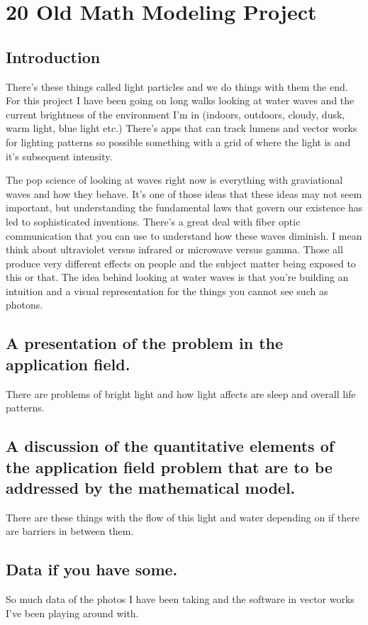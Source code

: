 \chapter{20 Old Math Modeling Project}
\section{Introduction}
There's these things called light particles and we do things with them the end. For this project I have been going on long walks looking at water waves and the current brightness of the environment I'm in (indoors, outdoors, cloudy, dusk, warm light, blue light etc.) There's apps that can track lumens and vector works for lighting patterns so possible something with a grid of where the light is and it's subsequent intensity. 

\par 
The pop science of looking at waves right now is everything with graviational waves and how they behave. It's one of those ideas that these ideas may not seem important, but understanding the fundamental laws that govern our existence has led to sophisticated inventions. There's a great deal with fiber optic communication that you can use to understand how these waves diminish. I mean think about ultraviolet versus infrared or microwave versus gamma. Those all produce very different effects on people and the subject matter being exposed to this or that. The idea behind looking at water waves is that you're building an intuition and a visual representation for the things you cannot see such as photons. 

\section{A presentation of the problem in the application field.}

There are problems of bright light and how light affects are sleep and overall life patterns. 

\section{A discussion of the quantitative elements of the application field problem that are to be addressed by the mathematical model.}
There are these things with the flow of this light and water depending on if there are barriers in between them. 

\section{Data if you have some.} 
So much data of the photos I have been taking and the software in vector works I've been playing around with. 

